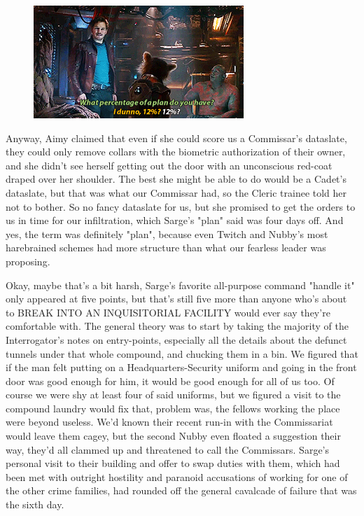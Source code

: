 \begin{figure}
	\begin{center}
		\includegraphics[width=\figwidth]{pics/21/32.png}
	\end{center}
\end{figure}
Anyway, Aimy claimed that even if she could score us a Commissar's dataslate, they could only remove collars with the biometric authorization of their owner, and she didn't see herself getting out the door with an unconscious red-coat draped over her shoulder. 
The best she might be able to do would be a Cadet's dataslate, but that was what our Commissar had, so the Cleric trainee told her not to bother. 
So no fancy dataslate for us, but she promised to get the orders to us in time for our infiltration, which Sarge's "plan" said was four days off. 
And yes, the term was definitely "plan", because even Twitch and Nubby's most harebrained schemes had more structure than what our fearless leader was proposing.

Okay, maybe that's a bit harsh, Sarge's favorite all-purpose command "handle it" only appeared at five points, but that's still five more than anyone who's about to BREAK INTO AN INQUISITORIAL FACILITY would ever say they're comfortable with. 
The general theory was to start by taking the majority of the Interrogator's notes on entry-points, especially all the details about the defunct tunnels under that whole compound, and chucking them in a bin. 
We figured that if the man felt putting on a Headquarters-Security uniform and going in the front door was good enough for him, it would be good enough for all of us too. 
Of course we were shy at least four of said uniforms, but we figured a visit to the compound laundry would fix that, problem was, the fellows working the place were beyond useless. 
We'd known their recent run-in with the Commissariat would leave them cagey, but the second Nubby even floated a suggestion their way, they'd all clammed up and threatened to call the Commissars. 
Sarge's personal visit to their building and offer to swap duties with them, which had been met with outright hostility and paranoid accusations of working for one of the other crime families, had rounded off the general cavalcade of failure that was the sixth day.


